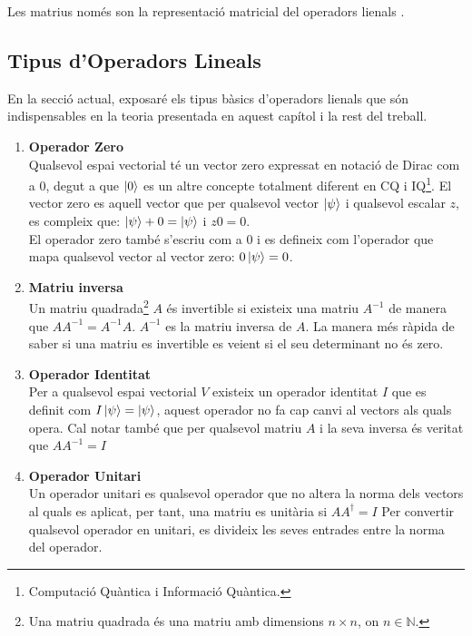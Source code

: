 Les matrius només son la representació matricial del operadors lienals \cite{LR_done_right:matrix}.

	\subsection{Tipus d'Operadors Lineals}
En la secció actual, exposaré els tipus bàsics d'operadors lienals que són indispensables en la teoria presentada en aquest capítol i la rest del treball.

\begin{enumerate}
	\item \textbf{Operador Zero} \\
	Qualsevol espai vectorial té un vector zero expressat en notació de Dirac com a $0$, degut a que $\ket{0}$ es un altre concepte totalment diferent en CQ i IQ\footnote{Computació Quàntica i Informació Quàntica.}. El vector zero es aquell vector que per qualsevol vector $\ket{\psi}$ i qualsevol escalar $z$, es compleix que:	
	$\ket{\psi} + 0 = \ket{\psi} $ i $z0 = 0$. \\
	El operador zero també s'escriu com a $0$ i es defineix com l'operador que mapa qualsevol vector al vector zero: $0\ket{\psi} = 0 $.  
	
	\item \textbf{Matriu inversa} \\
	Un matriu quadrada\footnote{Una matriu quadrada és una matriu amb dimensions $n\times n$, on $n \in \mathbb{N}$.} $A$ és invertible si existeix una matriu $A^{-1}$ de manera que $AA^{-1}=A^{-1}A$. $A^{-1}$ es la matriu inversa de $A$. La manera més ràpida de saber si una matriu es invertible es veient si el seu determinant no és zero.

	\item \textbf{Operador Identitat} \\
	Per a qualsevol espai vectorial $V$ existeix un operador identitat $I$ que es definit com $I\ket{\psi} = \ket{\psi}$, aquest operador no fa cap canvi al vectors als quals opera. Cal notar també que per qualsevol matriu $A$ i la seva inversa és veritat que $AA^{-1} = I$
	
	\item \textbf{Operador Unitari} \\
	Un operador unitari es qualsevol operador que no altera la norma dels vectors al quals es aplicat, per tant, una matriu es unitària si $AA^\dagger = I$
	Per convertir qualsevol operador en unitari, es divideix les seves entrades entre la norma del operador. 
	

\end{enumerate}
